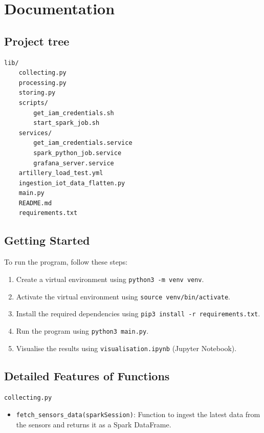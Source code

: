 \documentclass[12pt,oneside]{book} %
\begin{document}



\appendix
\chapter{Documentation}

\begin{subappendices}
    \section{Project tree}
    \begin{lstlisting}[breaklines=true, basicstyle=\small]
    lib/
    collecting.py
    processing.py
    storing.py
    scripts/
        get_iam_credentials.sh
        start_spark_job.sh
    services/
        get_iam_credentials.service
        spark_python_job.service
        grafana_server.service
    artillery_load_test.yml
    ingestion_iot_data_flatten.py
    main.py
    README.md
    requirements.txt
    \end{lstlisting}

    \section{Getting Started}
    To run the program, follow these steps:
    \begin{enumerate}
        \itemindent=17.87pt
        \item Create a virtual environment using \texttt{python3 -m venv venv}.
        \item Activate the virtual environment using \texttt{source venv/bin/activate}.
        \item Install the required dependencies using \texttt{pip3 install -r
                  requirements.txt}.
        \item Run the program using \texttt{python3 main.py}.
        \item Visualise the results using \texttt{visualisation.ipynb} (Jupyter Notebook).
    \end{enumerate}

    \section{Detailed Features of Functions}
    \begin{description}
        \item \texttt{collecting.py}
              \begin{itemize}
                  \item \texttt{fetch\_sensors\_data(sparkSession)}: Function to ingest the latest data from the sensors and returns it as a Spark DataFrame.
              \end{itemize}


\end{description}
\end{subappendices}
\end{document}
